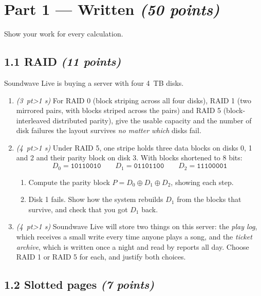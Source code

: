 \documentclass[11pt]{article}
\newcommand{\pts}[1]{\hfill\textit{(#1 points)}}
\newcommand{\pt}[1]{\textit{(#1~pt\ifnum#1>1 s\fi)}}
\begin{document}
\newpage
\section*{Part 1 --- Written \hfill \textit{(50 points)}}

Show your work for every calculation.

\subsection*{1.1 RAID \pts{11}}

Soundwave Live is buying a server with four 4~TB disks.

\begin{enumerate}[label=(\alph*)]
  \item \pt{3} For RAID 0 (block striping across all four disks), RAID 1 (two
  mirrored pairs, with blocks striped across the pairs) and RAID 5
  (block-interleaved distributed parity), give the usable capacity and the
  number of disk failures the layout survives \emph{no matter which} disks fail.

  \item \pt{4} Under RAID 5, one stripe holds three data blocks on disks 0, 1
  and 2 and their parity block on disk 3. With blocks shortened to 8 bits:
  \[
    D_0 = \texttt{10110010} \qquad D_1 = \texttt{01101100} \qquad D_2 = \texttt{11100001}
  \]
  \begin{enumerate}[label=\arabic*., nosep]
    \item Compute the parity block $P = D_0 \oplus D_1 \oplus D_2$, showing each step.
    \item Disk 1 fails. Show how the system rebuilds $D_1$ from the blocks that
    survive, and check that you got $D_1$ back.
  \end{enumerate}

  \item \pt{4} Soundwave Live will store two things on this server: the
  \emph{play log}, which receives a small write every time anyone plays a song,
  and the \emph{ticket archive}, which is written once a night and read by
  reports all day. Choose RAID 1 or RAID 5 for each, and justify both choices.
\end{enumerate}

\subsection*{1.2 Slotted pages \pts{7}}
\end{document}
